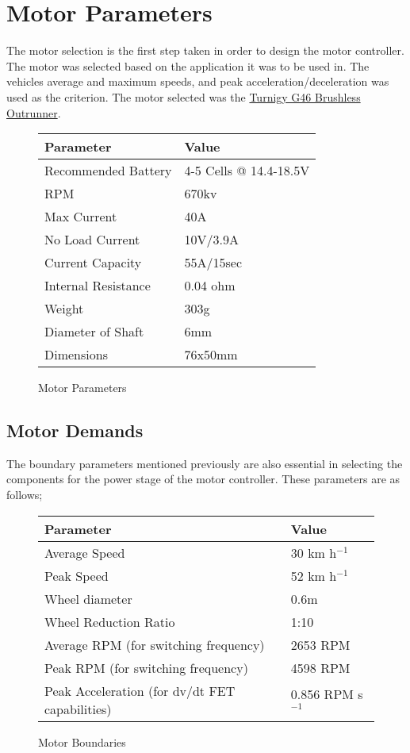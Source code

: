 \section{Motor Parameters}
The motor selection is the first step taken in order to design the motor
controller. The motor was selected based on the application it was to be used
in. The vehicles average and maximum speeds, and peak acceleration/deceleration
was used as the criterion.
The motor selected was the \href{http://www.hobbyking.com/hobbyking/store/__14404__Turnigy_G46_Brushless_Outrunner_670kv_46_Glow_.html}{Turnigy
G46 Brushless Outrunner}.

\begin{figure}[h!]
        \centering
        \begin{tabular}{ll}
        \hline
        Parameter & Value \\
        \hline
        Recommended Battery & 4-5 Cells @ 14.4-18.5V\\
        RPM & 670kv\\
        Max Current & 40A\\
        No Load Current & 10V/3.9A\\
        Current Capacity & 55A/15sec\\
        Internal Resistance & 0.04 ohm\\
        Weight & 303g\\
        Diameter of Shaft & 6mm\\
        Dimensions & 76x50mm\\
        \hline
        \end{tabular}
        \caption{Motor Parameters}
\end{figure}

\subsection{Motor Demands}
The boundary parameters mentioned previously are also essential in selecting
the components for the power stage of the motor controller. These parameters are
as follows;

\begin{figure}[h!]
        \centering
        \begin{tabular}{ll}
        \hline
        Parameter & Value \\
        \hline
        Average Speed & 30 km h$^{-1}$\\
        Peak Speed & 52 km h$^{-1}$\\
        Wheel diameter & 0.6m\\
        Wheel Reduction Ratio & 1:10\\
        Average RPM (for switching frequency) & 2653 RPM\\
        Peak RPM (for switching frequency) & 4598 RPM \\
        Peak Acceleration (for dv/dt FET capabilities) & 0.856 RPM s$^{-1}$\\
        \hline
        \end{tabular}
        \caption{Motor Boundaries}
\end{figure}
